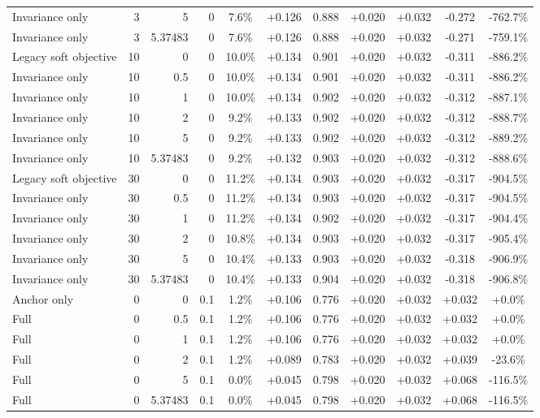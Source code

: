 \begin{table}[htbp]
\begin{tabular}{lrrrccccccc}
Invariance only & 3 & 5 & 0 & 7.6\% & +0.126 & 0.888 & +0.020 & +0.032 & -0.272 & -762.7\% \\
Invariance only & 3 & 5.37483 & 0 & 7.6\% & +0.126 & 0.888 & +0.020 & +0.032 & -0.271 & -759.1\% \\
Legacy soft objective & 10 & 0 & 0 & 10.0\% & +0.134 & 0.901 & +0.020 & +0.032 & -0.311 & -886.2\% \\
Invariance only & 10 & 0.5 & 0 & 10.0\% & +0.134 & 0.901 & +0.020 & +0.032 & -0.311 & -886.2\% \\
Invariance only & 10 & 1 & 0 & 10.0\% & +0.134 & 0.902 & +0.020 & +0.032 & -0.312 & -887.1\% \\
Invariance only & 10 & 2 & 0 & 9.2\% & +0.133 & 0.902 & +0.020 & +0.032 & -0.312 & -888.7\% \\
Invariance only & 10 & 5 & 0 & 9.2\% & +0.133 & 0.902 & +0.020 & +0.032 & -0.312 & -889.2\% \\
Invariance only & 10 & 5.37483 & 0 & 9.2\% & +0.132 & 0.903 & +0.020 & +0.032 & -0.312 & -888.6\% \\
Legacy soft objective & 30 & 0 & 0 & 11.2\% & +0.134 & 0.903 & +0.020 & +0.032 & -0.317 & -904.5\% \\
Invariance only & 30 & 0.5 & 0 & 11.2\% & +0.134 & 0.903 & +0.020 & +0.032 & -0.317 & -904.5\% \\
Invariance only & 30 & 1 & 0 & 11.2\% & +0.134 & 0.902 & +0.020 & +0.032 & -0.317 & -904.4\% \\
Invariance only & 30 & 2 & 0 & 10.8\% & +0.134 & 0.903 & +0.020 & +0.032 & -0.317 & -905.4\% \\
Invariance only & 30 & 5 & 0 & 10.4\% & +0.133 & 0.903 & +0.020 & +0.032 & -0.318 & -906.9\% \\
Invariance only & 30 & 5.37483 & 0 & 10.4\% & +0.133 & 0.904 & +0.020 & +0.032 & -0.318 & -906.8\% \\
Anchor only & 0 & 0 & 0.1 & 1.2\% & +0.106 & 0.776 & +0.020 & +0.032 & +0.032 & +0.0\% \\
Full & 0 & 0.5 & 0.1 & 1.2\% & +0.106 & 0.776 & +0.020 & +0.032 & +0.032 & +0.0\% \\
Full & 0 & 1 & 0.1 & 1.2\% & +0.106 & 0.776 & +0.020 & +0.032 & +0.032 & +0.0\% \\
Full & 0 & 2 & 0.1 & 1.2\% & +0.089 & 0.783 & +0.020 & +0.032 & +0.039 & -23.6\% \\
Full & 0 & 5 & 0.1 & 0.0\% & +0.045 & 0.798 & +0.020 & +0.032 & +0.068 & -116.5\% \\
Full & 0 & 5.37483 & 0.1 & 0.0\% & +0.045 & 0.798 & +0.020 & +0.032 & +0.068 & -116.5\% \\

\end{tabular}
\end{table}
